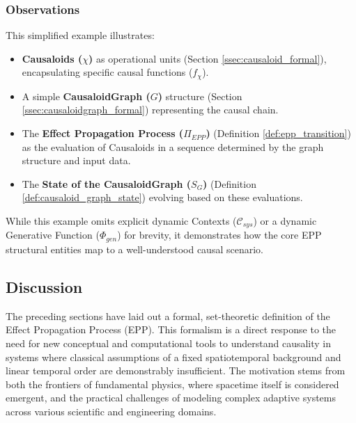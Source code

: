     \subsubsection{Observations}
    \label{ssec:example_observations_connection}
    This simplified example illustrates:
    \begin{itemize}
        \item \textbf{Causaloids (\(\chi\))} as operational units (Section \ref{ssec:causaloid_formal}), encapsulating specific causal functions (\(f_\chi\)).
        \item A simple \textbf{CausaloidGraph (\(G\))} structure (Section \ref{ssec:causaloidgraph_formal}) representing the causal chain.
        \item The \textbf{Effect Propagation Process (\(\Pi_{EPP}\))} (Definition \ref{def:epp_transition}) as the evaluation of Causaloids in a sequence determined by the graph structure and input data.
        \item The \textbf{State of the CausaloidGraph (\(S_G\))} (Definition \ref{def:causaloid_graph_state}) evolving based on these evaluations.
    \end{itemize}
    While this example omits explicit dynamic Contexts (\(\mathcal{C}_{sys}\)) or a dynamic Generative Function (\(\Phi_{gen}\)) for brevity, it demonstrates how the core EPP structural entities map to a well-understood causal scenario.
    
    
\subsection[Discussion]{Discussion} 
\label{sec:formalization_example_discussion}

The preceding sections have laid out a formal, set-theoretic definition of the Effect Propagation Process (EPP). This formalism is a direct response to the need for new conceptual and computational tools to understand causality in systems where classical assumptions of a fixed spatiotemporal background and linear temporal order are demonstrably insufficient. The motivation stems from both the frontiers of fundamental physics, where spacetime itself is considered emergent, and the practical challenges of modeling complex adaptive systems across various scientific and engineering domains.

